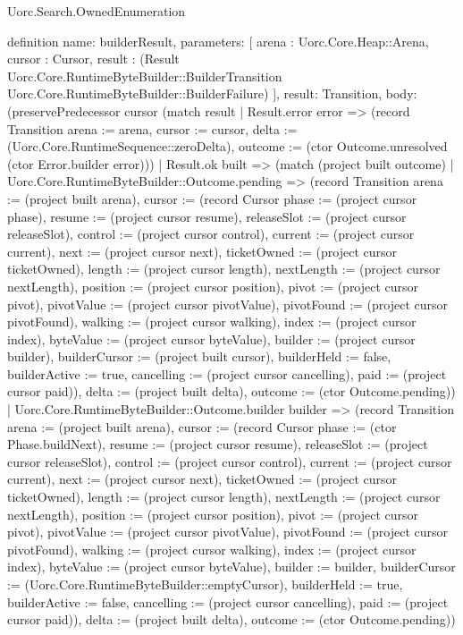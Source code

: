 \begin{lexlean}{Uorc.Search.OwnedEnumeration}
\begin{semanticmodule}
definition{
  name: builderResult,
  parameters: [
    arena : Uorc.Core.Heap::Arena,
    cursor : Cursor,
    result : (Result Uorc.Core.RuntimeByteBuilder::BuilderTransition Uorc.Core.RuntimeByteBuilder::BuilderFailure)
  ],
  result: Transition,
  body: (preservePredecessor cursor (match result
    | Result.error error => (record Transition {arena := arena, cursor := cursor, delta := (Uorc.Core.RuntimeSequence::zeroDelta), outcome := (ctor Outcome.unresolved (ctor Error.builder error))})
    | Result.ok built => (match (project built outcome)
      | Uorc.Core.RuntimeByteBuilder::Outcome.pending => (record Transition {arena := (project built arena), cursor := (record Cursor {phase := (project cursor phase), resume := (project cursor resume), releaseSlot := (project cursor releaseSlot), control := (project cursor control), current := (project cursor current), next := (project cursor next), ticketOwned := (project cursor ticketOwned), length := (project cursor length), nextLength := (project cursor nextLength), position := (project cursor position), pivot := (project cursor pivot), pivotValue := (project cursor pivotValue), pivotFound := (project cursor pivotFound), walking := (project cursor walking), index := (project cursor index), byteValue := (project cursor byteValue), builder := (project cursor builder), builderCursor := (project built cursor), builderHeld := false, builderActive := true, cancelling := (project cursor cancelling), paid := (project cursor paid)}), delta := (project built delta), outcome := (ctor Outcome.pending)})
      | Uorc.Core.RuntimeByteBuilder::Outcome.builder builder => (record Transition {arena := (project built arena), cursor := (record Cursor {phase := (ctor Phase.buildNext), resume := (project cursor resume), releaseSlot := (project cursor releaseSlot), control := (project cursor control), current := (project cursor current), next := (project cursor next), ticketOwned := (project cursor ticketOwned), length := (project cursor length), nextLength := (project cursor nextLength), position := (project cursor position), pivot := (project cursor pivot), pivotValue := (project cursor pivotValue), pivotFound := (project cursor pivotFound), walking := (project cursor walking), index := (project cursor index), byteValue := (project cursor byteValue), builder := builder, builderCursor := (Uorc.Core.RuntimeByteBuilder::emptyCursor), builderHeld := true, builderActive := false, cancelling := (project cursor cancelling), paid := (project cursor paid)}), delta := (project built delta), outcome := (ctor Outcome.pending)})
}
\end{semanticmodule}
\end{lexlean}
